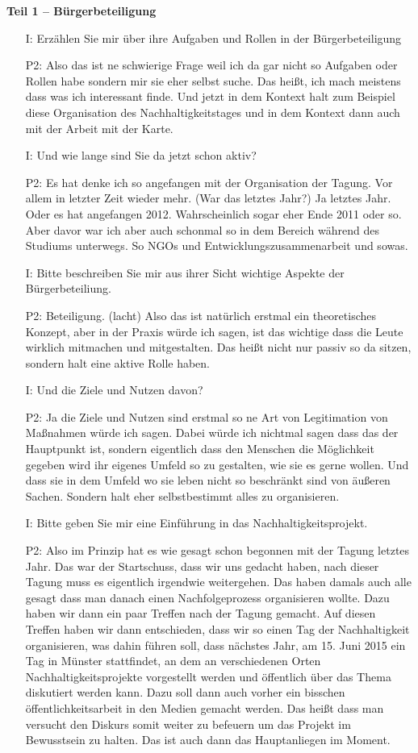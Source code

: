 \textbf{Teil 1 -- B{\"u}rgerbeteiligung}
\begin{itemize}
    \item[I:] Erz{\"a}hlen Sie mir {\"u}ber ihre Aufgaben und Rollen in der B{\"u}rgerbeteiligung
    \item[P2:] Also das ist ne schwierige Frage weil ich da gar nicht so Aufgaben oder Rollen habe sondern mir sie eher selbst suche. Das hei{\ss}t, ich mach meistens dass was ich interessant finde. Und jetzt in dem Kontext halt zum Beispiel diese Organisation des Nachhaltigkeitstages und in dem Kontext dann auch mit der Arbeit mit der Karte.
    \item[I:] Und wie lange sind Sie da jetzt schon aktiv? 
    \item[P2:] Es hat denke ich so angefangen mit der Organisation der Tagung. Vor allem in letzter Zeit wieder mehr. (War das letztes Jahr?) Ja letztes Jahr. Oder es hat angefangen 2012. Wahrscheinlich sogar eher Ende 2011 oder so. Aber davor war ich aber auch schonmal so in dem Bereich w{\"a}hrend des Studiums unterwegs. So NGOs und Entwicklungszusammenarbeit und sowas.
    \item[I:] Bitte beschreiben Sie mir aus ihrer Sicht wichtige Aspekte der B{\"u}rgerbeteiliung.
    \item[P2:] Beteiligung. (lacht) Also das ist nat{\"u}rlich erstmal ein theoretisches Konzept, aber in der Praxis w{\"u}rde ich sagen, ist das wichtige dass die Leute wirklich mitmachen und mitgestalten. Das hei{\ss}t nicht nur passiv so da sitzen, sondern halt eine aktive Rolle haben.
    \item[I:] Und die Ziele und Nutzen davon?
    \item[P2:] Ja die Ziele und Nutzen sind erstmal so ne Art von Legitimation von Ma{\ss}nahmen w{\"u}rde ich sagen. Dabei w{\"u}rde ich nichtmal sagen dass das der Hauptpunkt ist, sondern eigentlich dass den Menschen die M{\"o}glichkeit gegeben wird ihr eigenes Umfeld so zu gestalten, wie sie es gerne wollen. Und dass sie in dem Umfeld wo sie leben nicht so beschr{\"a}nkt sind von {\"a}u{\ss}eren Sachen. Sondern halt eher selbstbestimmt alles zu organisieren.
    \item[I:] Bitte geben Sie mir eine Einf{\"u}hrung in das Nachhaltigkeitsprojekt.
    \item[P2:] Also im Prinzip hat es wie gesagt schon begonnen mit der Tagung letztes Jahr. Das war der Startschuss, dass wir uns gedacht haben, nach dieser Tagung muss es eigentlich irgendwie weitergehen. Das haben damals auch alle gesagt dass man danach einen Nachfolgeprozess organisieren wollte. Dazu haben wir dann ein paar Treffen nach der Tagung gemacht. Auf diesen Treffen haben wir dann entschieden, dass wir so einen Tag der Nachhaltigkeit organisieren, was dahin f{\"u}hren soll, dass n{\"a}chstes Jahr, am 15. Juni 2015 ein Tag in M{\"u}nster stattfindet, an dem an verschiedenen Orten Nachhaltigkeitsprojekte vorgestellt werden und {\"o}ffentlich {\"u}ber das Thema diskutiert werden kann. Dazu soll dann auch vorher ein bisschen {\"o}ffentlichkeitsarbeit in den Medien gemacht werden. Das hei{\ss}t dass man versucht den Diskurs somit weiter zu befeuern um das Projekt im Bewusstsein zu halten. Das ist auch dann das Hauptanliegen im Moment.

\end{itemize}
